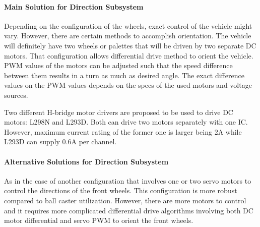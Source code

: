\documentclass[a4paper,12pt]{article}
\begin{document}
	\paragraph{Main Solution for Direction Subsystem}
	Depending on the configuration of the wheels, exact control of the vehicle might vary. However, there are certain methods to accomplish orientation. The vehicle will definitely have two wheels or palettes that will be driven by two separate DC motors. That configuration allows differential drive method to orient the vehicle. PWM values of the motors can be adjusted such that the speed difference between them results in a turn as much as desired angle. The exact difference values on the PWM values depends on the specs of the used motors and voltage sources. 
	
	Two different H-bridge motor drivers are proposed to be used to drive DC motors: L298N and L293D. Both can drive two motors separately with one IC. However, maximum current rating of the former one is larger being 2A while L293D can supply 0.6A per channel. 
	
	
	
	
	
	\paragraph{Alternative Solutions for Direction Subsystem}
	
	As in the case of another configuration that involves one or two servo motors to control the directions of the front wheels. This configuration is more robust compared to ball caster utilization. However, there are more motors to control and it requires more complicated differential drive algorithms involving both DC motor differential and servo PWM to orient the front wheels.
	
\end{document}
